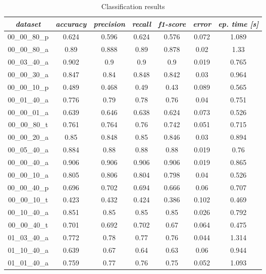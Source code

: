 \begin{table}[H]
\centering
\caption{Classification results}
\label{tab:classification_results}
\resizebox{\textwidth}{!} {
\begin{tabular}{|c|c|c|c|c|c|c|}
\hline
\textit{dataset} & \textit{accuracy} & \textit{precision} & \textit{recall} & \textit{f1-score} & \textit{error} & \textit{ep. time {[}s{]}} \\
\hline
00\_00\_80\_p 	& 0.624 	& 0.596 	& 0.624 	& 0.576 	& 0.072 	& 1.089 	 \\ \hline
00\_00\_80\_a 	& 0.89 	& 0.888 	& 0.89 	& 0.878 	& 0.02 	& 1.33 	 \\ \hline
00\_03\_40\_a 	& 0.902 	& 0.9 	& 0.9 	& 0.9 	& 0.019 	& 0.765 	 \\ \hline
00\_00\_30\_a 	& 0.847 	& 0.84 	& 0.848 	& 0.842 	& 0.03 	& 0.964 	 \\ \hline
00\_00\_10\_p 	& 0.489 	& 0.468 	& 0.49 	& 0.43 	& 0.089 	& 0.565 	 \\ \hline
00\_01\_40\_a 	& 0.776 	& 0.79 	& 0.78 	& 0.76 	& 0.04 	& 0.751 	 \\ \hline
00\_00\_01\_a 	& 0.639 	& 0.646 	& 0.638 	& 0.624 	& 0.073 	& 0.526 	 \\ \hline
00\_00\_80\_t	& 0.761 	& 0.764 	& 0.76 	& 0.742 	& 0.051 	& 0.715 	 \\ \hline
00\_00\_20\_a 	& 0.85 	& 0.848 	& 0.85 	& 0.846 	& 0.03 	& 0.894 	 \\ \hline
00\_05\_40\_a 	& 0.884 	& 0.88 	& 0.88 	& 0.88 	& 0.019 	& 0.76 	 \\ \hline
00\_00\_40\_a 	& 0.906 	& 0.906 	& 0.906 	& 0.906 	& 0.019 	& 0.865 	 \\ \hline
00\_00\_10\_a 	& 0.805 	& 0.806 	& 0.804 	& 0.798 	& 0.04 	& 0.526 	 \\ \hline
00\_00\_40\_p 	& 0.696 	& 0.702 	& 0.694 	& 0.666 	& 0.06 	& 0.707 	 \\ \hline
00\_00\_10\_t 	& 0.423 	& 0.432 	& 0.424 	& 0.386 	& 0.102 	& 0.469 	 \\ \hline
00\_10\_40\_a 	& 0.851 	& 0.85 	& 0.85 	& 0.85 	& 0.026 	& 0.792 	 \\ \hline
00\_00\_40\_t	& 0.701 	& 0.692 	& 0.702 	& 0.67 	& 0.064 	& 0.475 	 \\ \hline
01\_03\_40\_a 	& 0.772 	& 0.78 	& 0.77 	& 0.76 	& 0.044 	& 1.314 	 \\ \hline
01\_10\_40\_a 	& 0.639 	& 0.67 	& 0.64 	& 0.63 	& 0.06 	& 0.944 	 \\ \hline
01\_01\_40\_a 	& 0.759 	& 0.77 	& 0.76 	& 0.75 	& 0.052 	& 1.093 	 \\ \hline

\end{tabular}}
\end{table}
